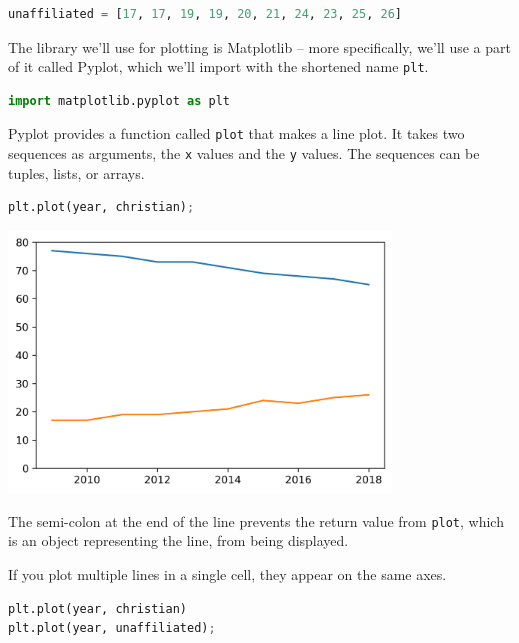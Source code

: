 \begin{lstlisting}[language=Python,style=source]
unaffiliated = [17, 17, 19, 19, 20, 21, 24, 23, 25, 26]
\end{lstlisting}

The library we'll use for plotting is Matplotlib -- more specifically,
we'll use a part of it called Pyplot, which we'll import with the
shortened name \passthrough{\lstinline!plt!}.

\begin{lstlisting}[language=Python,style=source]
import matplotlib.pyplot as plt
\end{lstlisting}

Pyplot provides a function called \passthrough{\lstinline!plot!} that
makes a line plot. It takes two sequences as arguments, the
\passthrough{\lstinline!x!} values and the \passthrough{\lstinline!y!}
values. The sequences can be tuples, lists, or arrays.

\begin{lstlisting}[language=Python,style=source]
plt.plot(year, christian);
\end{lstlisting}

\begin{center}
\includegraphics[width=4in]{chapters/06_plotting_files/06_plotting_28_0.png}
\end{center}

The semi-colon at the end of the line prevents the return value from
\passthrough{\lstinline!plot!}, which is an object representing the
line, from being displayed.

If you plot multiple lines in a single cell, they appear on the same
axes.

\begin{lstlisting}[language=Python,style=source]
plt.plot(year, christian)
plt.plot(year, unaffiliated);
\end{lstlisting}

